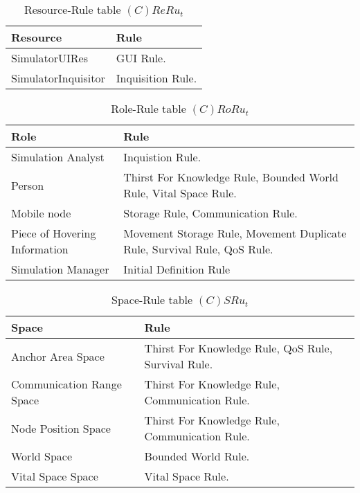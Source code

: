 \begin{table}[H]
	\centering
	\begin{tabular}{|p{4cm}|p{8cm}|}
			\hline
			\textbf{Resource} & \textbf{Rule} \\
			\hline
			SimulatorUIRes & GUI Rule. \\
			\hline
			SimulatorInquisitor & Inquisition Rule. \\
			\hline
		\end{tabular}
	\caption{Resource-Rule table $(C)ReRu_t$}
	\label{tab:crerut}
\end{table}

\begin{table}[H]
	\centering
	\begin{tabular}{|p{4cm}|p{8cm}|}
			\hline
			\textbf{Role} & \textbf{Rule} \\
			\hline
			Simulation Analyst & Inquistion Rule. \\
			\hline
			Person & Thirst For Knowledge Rule, Bounded World Rule, Vital Space Rule. \\
			\hline
			Mobile node & Storage Rule, Communication Rule. \\
			\hline
			Piece of Hovering Information & Movement Storage Rule, Movement Duplicate
			Rule, Survival Rule, QoS Rule. \\
			\hline
			Simulation Manager & Initial Definition Rule\\
			\hline
		\end{tabular}
	\caption{Role-Rule table $(C)RoRu_t$}
	\label{tab:crorut}
\end{table}

\begin{table}[H]
	\centering
	\begin{tabular}{|p{4cm}|p{8cm}|}
			\hline
			\textbf{Space} & \textbf{Rule} \\
			\hline
			Anchor Area Space & Thirst For Knowledge Rule, QoS Rule, Survival Rule. \\
			\hline
			Communication Range Space & Thirst For Knowledge Rule, Communication Rule. \\
			\hline
			Node Position Space & Thirst For Knowledge Rule, Communication Rule. \\
			\hline
			World Space & Bounded World Rule. \\
			\hline
			Vital Space Space & Vital Space Rule. \\
			\hline
		\end{tabular}
	\caption{Space-Rule table $(C)SRu_t$}
	\label{tab:cot}
\end{table}

